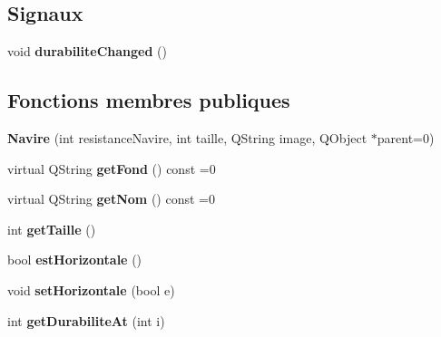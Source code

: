 \subsection*{Signaux}
\begin{DoxyCompactItemize}
\item 
void {\bfseries durabilite\+Changed} ()\hypertarget{class_navire_af6001492dec19fdc15ed08cd99b26ca6}{}\label{class_navire_af6001492dec19fdc15ed08cd99b26ca6}

\end{DoxyCompactItemize}
\subsection*{Fonctions membres publiques}
\begin{DoxyCompactItemize}
\item 
{\bfseries Navire} (int resistance\+Navire, int taille, Q\+String image, Q\+Object $\ast$parent=0)\hypertarget{class_navire_a7592aa386e7cdb2191e6371d864fe906}{}\label{class_navire_a7592aa386e7cdb2191e6371d864fe906}

\item 
virtual Q\+String {\bfseries get\+Fond} () const  =0\hypertarget{class_navire_aa62e28f2704afe3746ade20d709b501b}{}\label{class_navire_aa62e28f2704afe3746ade20d709b501b}

\item 
virtual Q\+String {\bfseries get\+Nom} () const  =0\hypertarget{class_navire_a56df9386755c950a090a88d1fb489c8a}{}\label{class_navire_a56df9386755c950a090a88d1fb489c8a}

\item 
int {\bfseries get\+Taille} ()\hypertarget{class_navire_a95c9ca9886dca33712784b90552e7fbc}{}\label{class_navire_a95c9ca9886dca33712784b90552e7fbc}

\item 
bool {\bfseries est\+Horizontale} ()\hypertarget{class_navire_a0177c715444d6bbb9106ee2cf3f01f4c}{}\label{class_navire_a0177c715444d6bbb9106ee2cf3f01f4c}

\item 
void {\bfseries set\+Horizontale} (bool e)\hypertarget{class_navire_a1b99e6f77f4f29a5b028e7e20db97774}{}\label{class_navire_a1b99e6f77f4f29a5b028e7e20db97774}

\item 
int {\bfseries get\+Durabilite\+At} (int i)\hypertarget{class_navire_aa249b069cccc930a5ad70d98c4d163f6}{}\label{class_navire_aa249b069cccc930a5ad70d98c4d163f6}


\end{DoxyCompactItemize}
